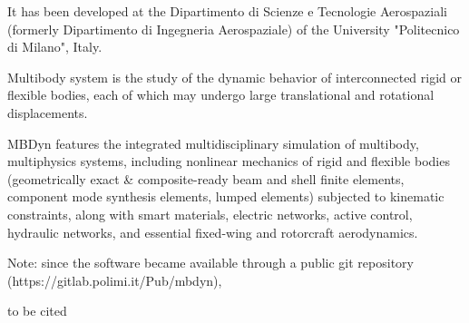 It has been developed at the Dipartimento di Scienze e Tecnologie Aerospaziali (formerly Dipartimento di Ingegneria Aerospaziale) of the University "Politecnico di Milano", Italy.

Multibody system is the study of the dynamic behavior of interconnected rigid or flexible bodies, each of which may undergo large translational and rotational displacements.

MBDyn features the integrated multidisciplinary simulation of multibody, multiphysics systems, including nonlinear mechanics of rigid and flexible bodies (geometrically exact & composite-ready beam and shell finite elements, component mode synthesis elements, lumped elements) subjected to kinematic constraints, along with smart materials, electric networks, active control, hydraulic networks, and essential fixed-wing and rotorcraft aerodynamics.

Note: since the software became available through a public git repository (https://gitlab.polimi.it/Pub/mbdyn),

to be cited \cite{masarati2014efficient}


%

